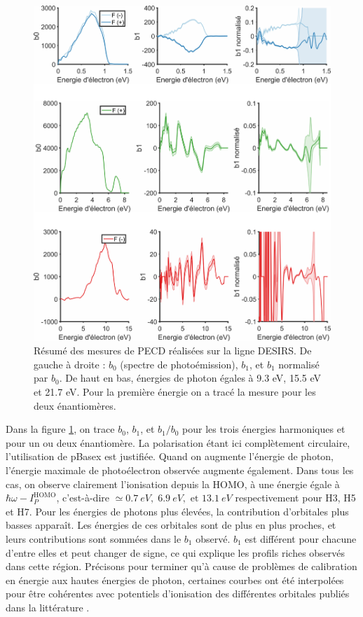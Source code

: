 \begin{figure}[!ht]
\centering
\includegraphics[width=1\columnwidth]{Figures/Soleil/Results_PECD.pdf}%
\caption{Résumé des mesures de PECD réalisées sur la ligne DESIRS. De gauche à droite : $b_0$ (spectre de photoémission), $b_1$, et $b_1$ normalisé par $b_0$. De haut en bas, énergies de photon égales à 9.3 eV, 15.5 eV et 21.7 eV. Pour la première énergie on a tracé la mesure pour les deux énantiomères.}
\label{fig:results_pecd}
\end{figure}

Dans la figure \ref{fig:results_pecd}, on trace $b_0$, $b_1$, et $b_1/b_0$ pour les trois énergies harmoniques et pour un ou deux énantiomère. La polarisation étant ici complètement circulaire, l'utilisation de pBasex est justifiée. Quand on augmente l'énergie de photon, l'énergie maximale de photoélectron observée augmente également. Dans tous les cas, on observe clairement l'ionisation depuis la HOMO, à une énergie égale à $\hbar\omega-I_P^\text{HOMO}$, c'est-à-dire $\simeq \SI{0.7}{eV},\; \SI{6.9}{eV},\text{ et }\SI{13.1}{eV}$ respectivement pour H3, H5 et H7. Pour les énergies de photons plus élevées, la contribution d'orbitales plus basses apparaît. Les énergies de ces orbitales sont de plus en plus proches, et leurs contributions sont sommées dans le $b_1$ observé. $b_1$ est différent pour chacune d'entre elles et peut changer de signe, ce qui explique les profils riches observés dans cette région. Précisons pour terminer qu'à cause de problèmes de calibration en énergie aux hautes énergies de photon, certaines courbes ont été interpolées pour être cohérentes avec potentiels d'ionisation des différentes orbitales publiés dans la littérature .
\newpage
